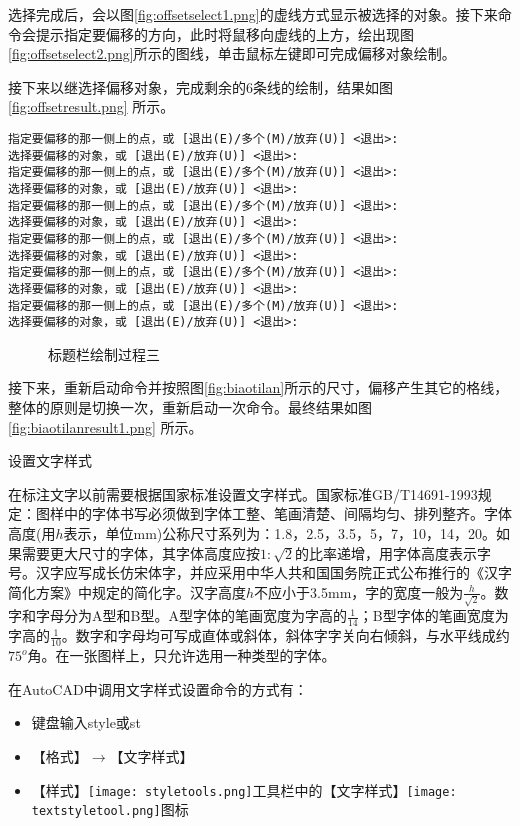 \begin{procedure}
选择完成后，会以图\ref{fig:offsetselect1.png}的虚线方式显示被选择的对象。接下来命令会提示指定要偏移的方向，此时将鼠移向虚线的上方，绘出现图\ref{fig:offsetselect2.png}所示的图线，单击鼠标左键即可完成偏移对象绘制。

接下来以继选择偏移对象，完成剩余的6条线的绘制，结果如图\ref{fig:offsetresult.png} 所示。
\begin{lstlisting}
指定要偏移的那一侧上的点，或 [退出(E)/多个(M)/放弃(U)] <退出>:
选择要偏移的对象，或 [退出(E)/放弃(U)] <退出>:
指定要偏移的那一侧上的点，或 [退出(E)/多个(M)/放弃(U)] <退出>:
选择要偏移的对象，或 [退出(E)/放弃(U)] <退出>:
指定要偏移的那一侧上的点，或 [退出(E)/多个(M)/放弃(U)] <退出>:
选择要偏移的对象，或 [退出(E)/放弃(U)] <退出>:
指定要偏移的那一侧上的点，或 [退出(E)/多个(M)/放弃(U)] <退出>:
选择要偏移的对象，或 [退出(E)/放弃(U)] <退出>:
指定要偏移的那一侧上的点，或 [退出(E)/多个(M)/放弃(U)] <退出>:
选择要偏移的对象，或 [退出(E)/放弃(U)] <退出>:
指定要偏移的那一侧上的点，或 [退出(E)/多个(M)/放弃(U)] <退出>:
选择要偏移的对象，或 [退出(E)/放弃(U)] <退出>:
\end{lstlisting}

\begin{figure}[htbp]
\centering
{}\hspace{30pt}
\caption{标题栏绘制过程三}
\end{figure}

接下来，重新启动命令并按照图\ref{fig:biaotilan}所示的尺寸，偏移产生其它的格线，整体的原则是切换一次，重新启动一次命令。最终结果如图\ref{fig:biaotilanresult1.png} 所示。
\item 设置文字样式

在标注文字以前需要根据国家标准设置文字样式。国家标准GB/T14691-1993规定：图样中的字体书写必须做到字体工整、笔画清楚、间隔均匀、排列整齐。字体高度(用$h$表示，单位mm)公称尺寸系列为：1.8，2.5，3.5，5，7，10，14，20。如果需要更大尺寸的字体，其字体高度应按$1:\sqrt{2}$的比率递增，用字体高度表示字号。汉字应写成长仿宋体字，并应采用中华人共和国国务院正式公布推行的《汉字简化方案》中规定的简化字。汉字高度$h$不应小于3.5mm，字的宽度一般为$\frac{h}{\sqrt{2}}$。数字和字母分为A型和B型。A型字体的笔画宽度为字高的$\frac{1}{14}$；B型字体的笔画宽度为字高的$\frac{1}{10}$。数字和字母均可写成直体或斜体，斜体字字关向右倾斜，与水平线成约$75^o$角。在一张图样上，只允许选用一种类型的字体。

在AutoCAD中调用文字样式设置命令的方式有：
\begin{itemize}
\item 键盘输入style或st
\item 【格式】$\rightarrow$【文字样式】
\item 【样式】\texttt{[image: styletools.png]}工具栏中的【文字样式】\texttt{[image: textstyletool.png]}图标
\end{itemize}


\end{procedure}
